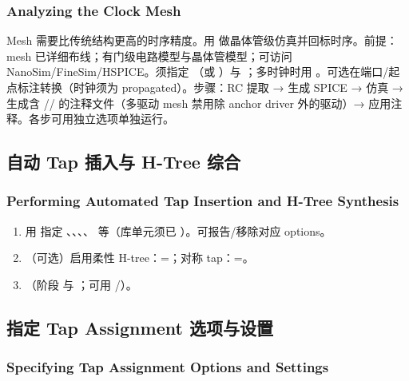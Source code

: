 \subsubsection*{Analyzing the Clock Mesh}

Mesh 需要比传统结构更高的时序精度。用  做晶体管级仿真并回标时序。前提：mesh 已详细布线；有门级电路模型与晶体管模型；可访问 NanoSim/FineSim/HSPICE。须指定 （或 ）与 ；多时钟时用 。可选在端口/起点标注转换（时钟须为 propagated）。步骤：RC 提取 → 生成 SPICE → 仿真 → 生成含 // 的注释文件（多驱动 mesh 禁用除 anchor driver 外的驱动）→ 应用注释。各步可用独立选项单独运行。

\subsection{自动 Tap 插入与 H-Tree 综合}
\subsubsection*{Performing Automated Tap Insertion and H-Tree Synthesis}

\begin{enumerate}
  \item 用  指定 、、、、 等（库单元须已 ）。可报告/移除对应 options。
  \item （可选）启用柔性 H-tree：=；对称 tap：=。
  \item {}（阶段  与 ；可用 /）。
\end{enumerate}

\subsection{指定 Tap Assignment 选项与设置}
\subsubsection*{Specifying Tap Assignment Options and Settings}

